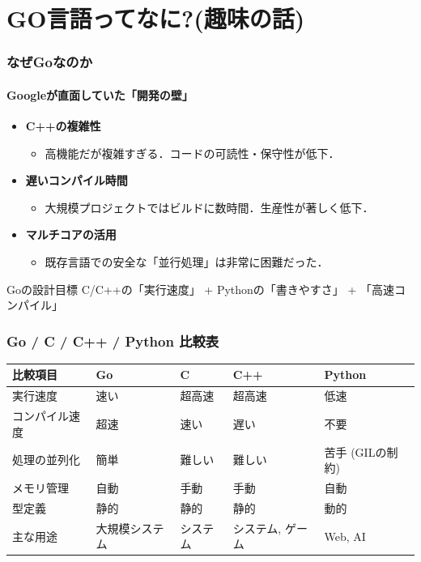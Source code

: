 \documentclass[dvipdfmx,12pt,aspectratio=169]{beamer}
\theoremstyle{definition} %
\begin{document}
\section{GO言語ってなに?(趣味の話)}
\begin{frame}
  \frametitle{なぜGoなのか}
  \framesubtitle{Googleが直面していた「開発の壁」}
  
  \begin{itemize}
    \item \textbf{C++の複雑性}
    \begin{itemize}
        \item 高機能だが複雑すぎる．コードの可読性・保守性が低下．
    \end{itemize}
    
    \item \textbf{遅いコンパイル時間}
    \begin{itemize}
        \item 大規模プロジェクトではビルドに数時間．生産性が著しく低下．
    \end{itemize}
    
    \item \textbf{マルチコアの活用}
    \begin{itemize}
        \item 既存言語での安全な「並行処理」は非常に困難だった．
    \end{itemize}
  \end{itemize}
  
  \begin{alertblock}{Goの設計目標}
    C/C++の「実行速度」 + Pythonの「書きやすさ」 + 「高速コンパイル」
  \end{alertblock}
\end{frame}

\begin{frame}
  \frametitle{Go / C / C++ / Python 比較表}
  \begin{tabular}{|l|l|l|l|l|} \hline
  比較項目 & Go & C & C++ & Python \\ \hline
  実行速度 & 速い & 超高速 & 超高速 & 低速 \\
  コンパイル速度 & \alert{超速} & 速い & \alert{遅い} & 不要 \\
  処理の並列化 & \alert{簡単} & 難しい & 難しい & \alert{苦手 (GILの制約)} \\
  メモリ管理 & 自動 & 手動 & 手動 & 自動 \\ 
  型定義 & 静的 & 静的 & 静的 & 動的 \\
  主な用途 & \alert{大規模システム} & システム & \alert{システム, ゲーム} & \alert{Web, AI} \\ \hline
  \end{tabular}
\end{frame}
\end{document}
